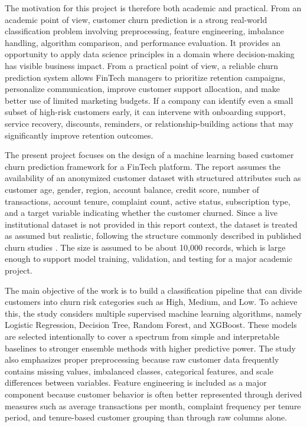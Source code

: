 The motivation for this project is therefore both academic and practical. From an academic point of view, customer churn prediction is a strong real-world classification problem involving preprocessing, feature engineering, imbalance handling, algorithm comparison, and performance evaluation. It provides an opportunity to apply data science principles in a domain where decision-making has visible business impact. From a practical point of view, a reliable churn prediction system allows FinTech managers to prioritize retention campaigns, personalize communication, improve customer support allocation, and make better use of limited marketing budgets. If a company can identify even a small subset of high-risk customers early, it can intervene with onboarding support, service recovery, discounts, reminders, or relationship-building actions that may significantly improve retention outcomes.

The present project focuses on the design of a machine learning based customer churn prediction framework for a FinTech platform. The report assumes the availability of an anonymized customer dataset with structured attributes such as customer age, gender, region, account balance, credit score, number of transactions, account tenure, complaint count, active status, subscription type, and a target variable indicating whether the customer churned. Since a live institutional dataset is not provided in this report context, the dataset is treated as assumed but realistic, following the structure commonly described in published churn studies \cite{malhotra2017,systematicreview}. The size is assumed to be about 10{,}000 records, which is large enough to support model training, validation, and testing for a major academic project.

The main objective of the work is to build a classification pipeline that can divide customers into churn risk categories such as High, Medium, and Low. To achieve this, the study considers multiple supervised machine learning algorithms, namely Logistic Regression, Decision Tree, Random Forest, and XGBoost. These models are selected intentionally to cover a spectrum from simple and interpretable baselines to stronger ensemble methods with higher predictive power. The study also emphasizes proper preprocessing because raw customer data frequently contains missing values, imbalanced classes, categorical features, and scale differences between variables. Feature engineering is included as a major component because customer behavior is often better represented through derived measures such as average transactions per month, complaint frequency per tenure period, and tenure-based customer grouping than through raw columns alone.

